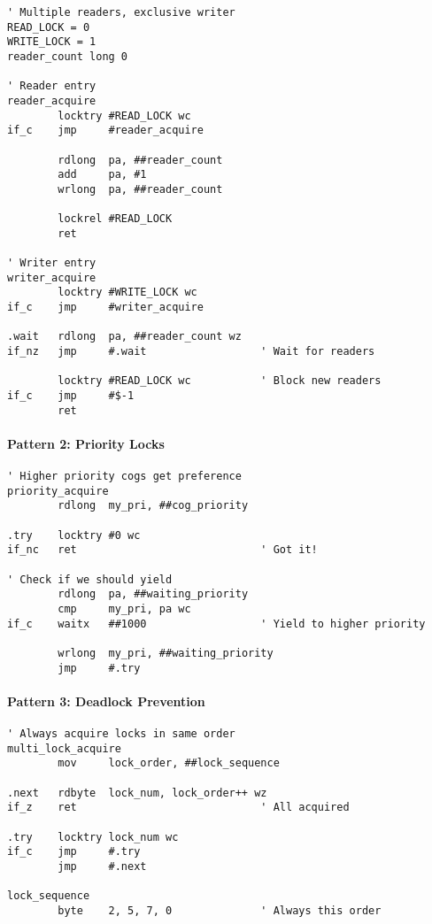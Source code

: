 \documentclass[11pt]{book}
\begin{document}
\begin{lstlisting}
' Multiple readers, exclusive writer
READ_LOCK = 0
WRITE_LOCK = 1
reader_count long 0

' Reader entry
reader_acquire
        locktry #READ_LOCK wc
if_c    jmp     #reader_acquire
        
        rdlong  pa, ##reader_count
        add     pa, #1
        wrlong  pa, ##reader_count
        
        lockrel #READ_LOCK
        ret

' Writer entry
writer_acquire
        locktry #WRITE_LOCK wc
if_c    jmp     #writer_acquire
        
.wait   rdlong  pa, ##reader_count wz
if_nz   jmp     #.wait                  ' Wait for readers
        
        locktry #READ_LOCK wc           ' Block new readers
if_c    jmp     #$-1
        ret
\end{lstlisting}

\hypertarget{pattern-2-priority-locks}{%
\paragraph{Pattern 2: Priority Locks}\label{pattern-2-priority-locks}}

\begin{lstlisting}
' Higher priority cogs get preference
priority_acquire
        rdlong  my_pri, ##cog_priority
        
.try    locktry #0 wc
if_nc   ret                             ' Got it!
        
' Check if we should yield
        rdlong  pa, ##waiting_priority
        cmp     my_pri, pa wc
if_c    waitx   ##1000                  ' Yield to higher priority
        
        wrlong  my_pri, ##waiting_priority
        jmp     #.try
\end{lstlisting}

\hypertarget{pattern-3-deadlock-prevention}{%
\paragraph{Pattern 3: Deadlock
Prevention}\label{pattern-3-deadlock-prevention}}

\begin{lstlisting}
' Always acquire locks in same order
multi_lock_acquire
        mov     lock_order, ##lock_sequence
        
.next   rdbyte  lock_num, lock_order++ wz
if_z    ret                             ' All acquired
        
.try    locktry lock_num wc
if_c    jmp     #.try
        jmp     #.next
        
lock_sequence
        byte    2, 5, 7, 0              ' Always this order
\end{lstlisting}
\end{document}
